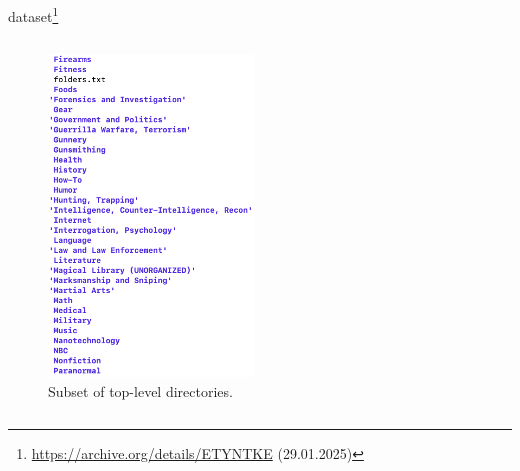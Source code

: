 \begin{frame}{\ac{dataset}\footnote{\url{https://archive.org/details/ETYNTKE} (29.01.2025)}}
\begin{columns}[T]
        \begin{column}{0.25\textwidth}
            \begin{figure}
                \includegraphics[width=\linewidth]{images/screenshot_data.png}
                \caption{Subset of top-level directories.} %
            \end{figure}
   
        \end{column}
    \end{columns}
\end{frame}
